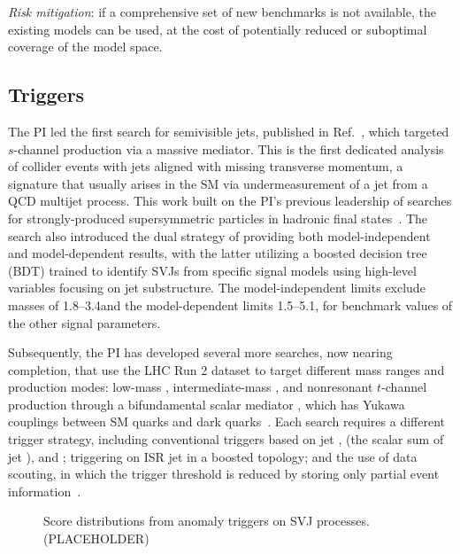 \textit{Risk mitigation}: if a comprehensive set of new benchmarks is not available, the existing models can be used, at the cost of potentially reduced or suboptimal coverage of the model space.

\subsection{Triggers}\label{subsec:trig}

The PI led the first search for semivisible jets, published in Ref.~\cite{CMS:2021dzg}, which targeted $s$-channel production via a massive \PZprime mediator.
This is the first dedicated analysis of collider events with jets aligned with missing transverse momentum,
a signature that usually arises in the SM via undermeasurement of a jet from a QCD multijet process.
This work built on the PI's previous leadership of searches for strongly-produced supersymmetric particles in hadronic final states~\cite{Khachatryan:2016kdk,Sirunyan:2017cwe,Sirunyan:2019hzr,Sirunyan:2019ctn,CMS:2023xlp}.
The search also introduced the dual strategy of providing both model-independent and model-dependent results,
with the latter utilizing a boosted decision tree (BDT) trained to identify SVJs from specific signal models using high-level variables focusing on jet substructure.
The model-independent limits exclude \PZprime masses of 1.8--3.4\TeV and the model-dependent limits 1.5--5.1\TeV, for benchmark values of the other signal parameters.

Subsequently, the PI has developed several more searches, now nearing completion, that use the LHC Run 2 dataset to target different mass ranges and production modes:
low-mass \PZprime, intermediate-mass \PZprime, and nonresonant $t$-channel production through a bifundamental scalar mediator \Pbifun,
which has Yukawa couplings \sbifun between SM quarks and dark quarks~\cite{Cohen:2017pzm}.
Each search requires a different trigger strategy,
including conventional triggers based on jet \pt, \HT (the scalar sum of jet \pt), and \ptmiss;
triggering on ISR jet \pt in a boosted topology;
and the use of data scouting, in which the \HT trigger threshold is reduced by storing only partial event information~\cite{Mukherjee:2019anz}.

\begin{figure}[htb!]
\centering
{}
\caption{Score distributions from anomaly triggers on SVJ processes. (PLACEHOLDER)}
\label{fig:svjanomaly}
\end{figure}

